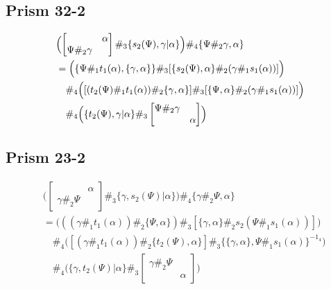 \documentclass[11pt, reqno]{amsart} %
\theoremstyle{definition}
\theoremstyle{remark}
\numberwithin{equation}{section}
\begin{document}
\subsection{Prism 32-2} 
\begin{align}
  \nonumber
  &
  \Bigl(
    \begin{bmatrix}& \alpha \\ \Psi\#_2\gamma &\end{bmatrix}
    \#_3
    \{s_2(\Psi),\gamma|\alpha\}
  \Bigr)
  \#_4
  \{\Psi\#_2\gamma,\alpha\} \\
  \nonumber
  &= 
  \Bigl(
    \{\Psi\#_1t_1(\alpha),\{\gamma,\alpha\}\}
    \#_3
    [\{s_2(\Psi),\alpha\}\#_2(\gamma\#_1s_1(\alpha))]
  \Bigr) \\
  \nonumber
  &\quad \#_4
  \Bigl(
    [(t_2(\Psi)\#_1t_1(\alpha))\#_2\{\gamma,\alpha\}]\#_3[\{\Psi,\alpha\}\#_2(\gamma\#_1s_1(\alpha))]
  \Bigr) \\
  \label{eq:Prism32|2}
  &\quad \#_4
  \Bigl(
    \{t_2(\Psi),\gamma|\alpha\}
    \#_3
    \begin{bmatrix}\Psi\#_2\gamma & \\ & \alpha\end{bmatrix}
  \Bigr)
\end{align}

\subsection{Prism 23-2}
\begin{align}
  \nonumber
  &
  \bigl(
    \begin{bmatrix} & \alpha \\ \gamma\#_2\Psi &\end{bmatrix}
    \#_3
    \{\gamma,s_2(\Psi)|\alpha\}
  \bigr)
  \#_4
  \{\gamma\#_2\Psi,\alpha\} \\
  \nonumber
  &= 
  \bigl(
    ((\gamma\#_1t_1(\alpha))\#_2\{\Psi,\alpha\})
    \#_3
    [\{\gamma,\alpha\}\#_2s_2(\Psi\#_1s_1(\alpha))]
  \bigr) \\
  \nonumber
  &\quad \#_4
  \bigl(
    [(\gamma\#_1t_1(\alpha))\#_2\{t_2(\Psi),\alpha\}]
    \#_3
    \{\{\gamma,\alpha\},\Psi\#_1s_1(\alpha)\}^{-1_4}
  \bigr) \\
  \label{eq:Prism23|2}
  &\quad \#_4
  \bigl(
    \{\gamma,t_2(\Psi)|\alpha\}
    \#_3
    \begin{bmatrix}\gamma\#_2\Psi & \\ & \alpha\end{bmatrix}
  \bigr)
\end{align}
\end{document}
